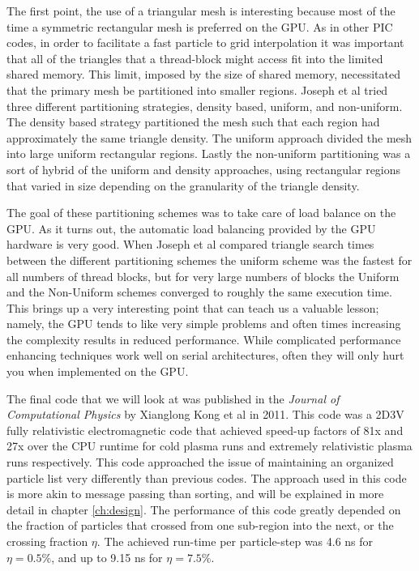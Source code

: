 The first point, the use of a triangular mesh is interesting because most of the time a symmetric rectangular mesh is preferred on the GPU. As in other PIC codes, in order to facilitate a fast particle to grid interpolation it was important that all of the triangles that a thread-block might access fit into the limited shared memory. This limit, imposed by the size of shared memory, necessitated that the primary mesh be partitioned into smaller regions. Joseph et al tried three different partitioning strategies, density based, uniform, and non-uniform. The density based strategy partitioned the mesh such that each region had approximately the same triangle density. The uniform approach divided the mesh into large uniform rectangular regions. Lastly the non-uniform partitioning was a sort of hybrid of the uniform and density approaches, using rectangular regions that varied in size depending on the granularity of the triangle density.\cite{Joseph2011}

The goal of these partitioning schemes was to take care of load balance on the GPU. As it turns out, the automatic load balancing provided by the GPU hardware is very good. When Joseph et al compared triangle search times between the different partitioning schemes the uniform scheme was the fastest for all numbers of thread blocks, but for very large numbers of blocks the Uniform and the Non-Uniform schemes converged to roughly the same execution time. This brings up a very interesting point that can teach us a valuable lesson; namely, the GPU tends to like very simple problems and often times increasing the complexity results in reduced performance. While complicated performance enhancing techniques work well on serial architectures, often they will only hurt you when implemented on the GPU. 

The final code that we will look at was published in the \emph{Journal of Computational Physics} by Xianglong Kong et al in 2011.\cite{Kong2011} This code was a 2D3V fully relativistic electromagnetic code that achieved speed-up factors of 81x and 27x over the CPU runtime for cold plasma runs and extremely relativistic plasma runs respectively. This code approached the issue of maintaining an organized particle list very differently than previous codes. The approach used in this code is more akin to message passing than sorting, and will be explained in more detail in chapter \ref{ch:design}. The performance of this code greatly depended on the fraction of particles that crossed from one sub-region into the next, or the crossing fraction $\eta$. The achieved run-time per particle-step was 4.6 ns for $\eta=0.5\%$, and up to 9.15 ns for $\eta=7.5\%$. 

